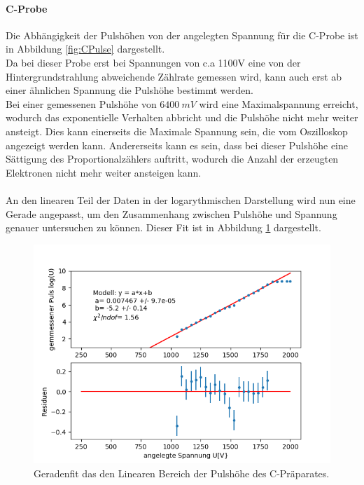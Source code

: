 \documentclass[12pt,a4paper]{article}
\begin{document}
\paragraph{C-Probe}
Die Abhängigkeit der Pulshöhen von der angelegten Spannung für die C-Probe ist in Abbildung \ref{fig:CPulse} dargestellt.\\
Da bei dieser Probe erst bei Spannungen von c.a 1100V eine von der Hintergrundstrahlung abweichende Zählrate gemessen wird, kann auch erst ab einer ähnlichen Spannung die Pulshöhe bestimmt werden.\\
Bei einer gemessenen Pulshöhe von $\SI{6400}{mV}$ wird eine Maximalspannung erreicht, wodurch das exponentielle Verhalten abbricht und die Pulshöhe nicht mehr weiter ansteigt. Dies kann einerseits die Maximale Spannung sein, die vom Oszilloskop angezeigt werden kann. Andererseits kann es sein, dass bei dieser Pulshöhe eine Sättigung des Proportionalzählers auftritt, wodurch die Anzahl der erzeugten Elektronen nicht mehr weiter ansteigen kann.\\
\\
An den linearen Teil der Daten in der logarythmischen Darstellung wird nun eine Gerade angepasst, um den Zusammenhang zwischen Pulshöhe und Spannung genauer untersuchen zu können. Dieser Fit ist in Abbildung \ref{fig:CPulsfit} dargestellt.\\

\begin{figure}
\centering
\includegraphics[scale=0.8]{Bilder/Prop/C_Pulsfit.PNG}
\caption{Geradenfit das den Linearen Bereich der Pulshöhe des C-Präparates.}
\label{fig:CPulsfit}
\end{figure}
\end{document}
